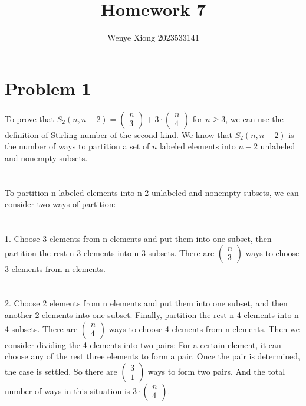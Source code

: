 \documentclass{article}
\author{Wenye Xiong 2023533141}
\title{Homework 7}
\begin{document}
\maketitle
\section{Problem 1}
To prove that $S_2(n,n-2) = 
\begin{pmatrix}
n\\
3
\end{pmatrix} + 3 \cdot
\begin{pmatrix}
n\\
4
\end{pmatrix}$ for $n \geq 3$, we can use the definition of Stirling number of the second kind. We know that $S_2(n,n-2)$ is the number of ways to partition a set of $n$ labeled elements into $n-2$ unlabeled and nonempty subsets.\\
\\ \hspace*{\fill} \\
To partition n labeled elements into n-2 unlabeled and nonempty subsets, we can consider two ways of partition: \\
\\ \hspace*{\fill} \\
1. Choose 3 elements from n elements and put them into one subset, then partition the rest n-3 elements into n-3 subsets. There are $\begin{pmatrix}
n\\
3
\end{pmatrix}$ ways to choose 3 elements from n elements.\\
\\ \hspace*{\fill} \\
2. Choose 2 elements from n elements and put them into one subset, and then another 2 elements into one subset. Finally, partition the rest n-4 elements into n-4 subsets. There are $\begin{pmatrix}
n\\
4
\end{pmatrix}$ ways to choose 4 elements from n elements. Then we consider dividing the 4 elements into two pairs: For a certain element, it can choose any of the rest three elements to form a pair. Once the pair is determined, the case is settled. So there are $\begin{pmatrix}
3\\
1
\end{pmatrix}$ ways to form two pairs. And the total number of ways in this situation is $ 3 \cdot \begin{pmatrix}
n\\
4
\end{pmatrix}$.\\
\end{document}
